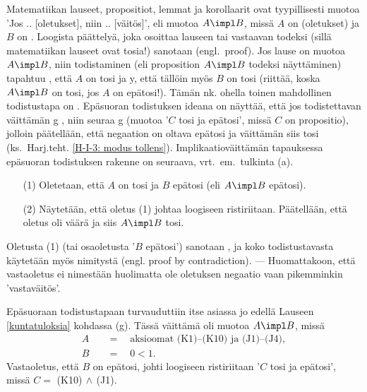 Matematiikan lauseet, propositiot, lemmat ja korollaarit ovat tyypillisesti muotoa 'Jos .. 
[oletukset], niin .. [väitös]', eli muotoa $A \impl B$, missä $A$ on  (oletukset)
ja $B$ on . Loogista päättelyä, joka osoittaa lauseen tai vastaavan todeksi 
(sillä matematiikan lauseet ovat tosia!) sanotaan
%
 (engl.\ proof). Jos lause
on muotoa $A \impl B$, niin todistaminen (eli proposition $A \impl B$ todeksi näyttäminen)
tapahtuu , että $A$ on tosi ja y, että tällöin myös
$B$ on tosi (riittää, koska $A \impl B$ on tosi, jos $A$ on epätosi!). Tämän nk.
%
 ohella toinen mahdollinen todistustapa on 
%
. Epäsuoran todistuksen ideana on näyttää, että jos todistettavan
väittämän  g  , niin seuraa
g  (muotoa '$C$ tosi ja epätosi', missä $C$ on
propositio), jolloin päätellään, että negaation on oltava epätosi ja väittämän siis tosi
(ks.\ Harj.teht. \ref{H-I-3: modus tollens}). Implikaatioväittämän tapauksessa epäsuoran
todistuksen rakenne on seuraava, vrt.\ em.\ tulkinta (a).
\begin{itemize}
\item[(1)] Oletetaan, että $A$ on tosi ja $B$ epätosi (eli $A \impl B$ epätosi).
\item[(2)] Näytetään, että oletus (1) johtaa loogiseen ristiriitaan. Päätellään, että oletus oli
           väärä ja siis $A \impl B$ tosi.
\end{itemize}
Oletusta (1) (tai osaoletusta '$B$ epätosi') sanotaan
%
, ja koko 
todistustavasta käytetään myös nimitystä  (engl. proof by 
contradiction). --- Huomattakoon, että vastaoletus ei nimestään huolimatta ole oletuksen
negaatio vaan pikemminkin 'vastaväitös'. 

Epäsuoraan todistustapaan turvauduttiin itse asiassa jo edellä Lauseen \ref{kuntatuloksia}  
kohdassa (g). Tässä väittämä oli muotoa $A \impl B$, missä
\begin{align*}
A \quad &= \quad \text{aksioomat (K1)--(K10) ja (J1)--(J4)}, \\
B \quad &= \quad 0 < 1.
\end{align*}
Vastaoletus, että $B$ on epätosi, johti loogiseen ristiriitaan '$C$ tosi ja epätosi',
missä $C=$ (K10)$\,\wedge\,$(J1). 

